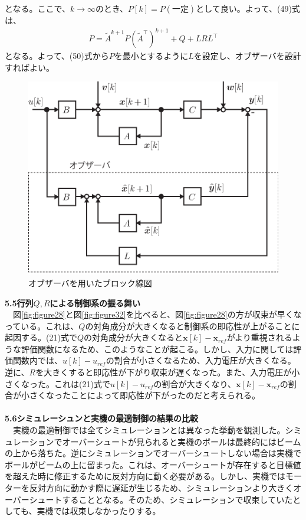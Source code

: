 \documentclass[a4paper,10.5pt]{ltjsarticle}
\begin{document}
となる。ここで、$k\rightarrow\infty$のとき、$P[k]=P(一定)$として良い。よって、(49)式は、
\begin{align}
  P=\tilde{A}^{k+1}P\left(\tilde{A}^\top\right)^{k+1}+Q+LRL^\top
\end{align}
となる。よって、(50)式から$P$を最小とするように$L$を設定し、オブザーバを設計すればよい。
\begin{figure}[h]
  \centering
  \includegraphics{figure43.eps}
  \caption{オブザーバを用いたブロック線図}
  \label{fig:figure43}
\end{figure}
\clearpage
{\large \bfseries 5.5行列$Q,R$による制御系の振る舞い}\\
　図\ref{fig:figure28}と図\ref{fig:figure32}を比べると、図\ref{fig:figure28}の方が収束が早くなっている。これは、$Q$の対角成分が大きくなると制御系の即応性が上がることに起因する。(21)式で$Q$の対角成分が大きくなると$\bm x[k]-\bm x_{ref}$がより重視されるような評価関数になるため、このようなことが起こる。しかし、入力に関しては評価関数内では、$u[k]-u_{ref}$の割合が小さくなるため、入力電圧が大きくなる。逆に、$R$を大きくすると即応性が下がり収束が遅くなった。また、入力電圧が小さくなった。これは(21)式で$u[k]-u_{ref}$の割合が大きくなり、$\bm x[k]-\bm x_{ref}$の割合が小さくなったことによって即応性が下がったのだと考えられる。　\\
\\
{\large \bfseries 5.6シミュレーシュンと実機の最適制御の結果の比較}\\
　実機の最適制御では全てシミュレーションとは異なった挙動を観測した。シミュレーションでオーバーシュートが見られると実機のボールは最終的にはビームの上から落ちた。逆にシミュレーションでオーバーシュートしない場合は実機でボールがビームの上に留まった。これは、オーバーシュートが存在すると目標値を超えた時に修正するために反対方向に動く必要がある。しかし、実機ではモーターを反対方向に動かす際に遅延が生じるため、シミュレーションより大きくオーバーシュートすることとなる。そのため、シミュレーションで収束していたとしても、実機では収束しなかったりする。\\
\end{document}
